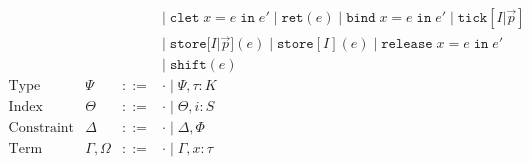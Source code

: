$$\begin{array}{llll}
&&&|\; \texttt{clet} \; x = e \; \texttt{in} \; e' \;|\; \texttt{ret}(e) \;|\; \texttt{bind} \; x = e \; \texttt{in} \; e' \;|\; \texttt{tick}[I|\vec{p}] \\
&&&|\; \texttt{store}[I|\vec{p}](e) \;|\; \texttt{store}[I](e) \;|\; \texttt{release} \; x = e \; \texttt{in} \; e'\\
&&&|\; \texttt{shift}(e)
\\
\text{Type Variable Context} & \Psi & ::= & \cdot \; | \; \Psi, \tau : K\\
\text{Index Variable Context} & \Theta & ::= & \cdot \; | \; \Theta, i : S\\
\text{Constraint Context} & \Delta & ::= & \cdot \; | \; \Delta, \Phi\\
\text{Term Variable Context} & \Gamma,\Omega & ::= & \cdot \; | \; \Gamma, x : \tau\\
\end{array}
$$
